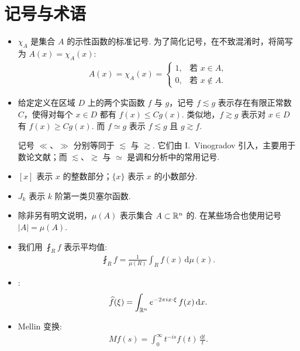 \chapter*{记号与术语}

\begin{itemize}
\item
  $\chi_A$ 是集合 $A$ 的示性函数的标准记号. 为了简化记号，在不致混淆时，将简写为 $A(x) = \chi_A(x)$:
  \begin{align*}
    A(x) = \chi_A(x) =
    \begin{cases}
      1, & \text{若 } x \in A, \\
      0, & \text{若 } x \notin A.
    \end{cases}
  \end{align*}

\item
  给定定义在区域 $D$ 上的两个实函数 $f$ 与 $g$，记号 $f \lesssim g$ 表示存在有限正常数 $C$，使得对每个 $x \in D$ 都有 $f(x) \le C g(x)$. 类似地，$f \gtrsim g$ 表示对 $x \in D$ 有 $f(x) \ge C g(x)$. 而 $f \simeq g$ 表示 $f \lesssim g$ 且 $g \gtrsim f$.

  记号 $\ll$、$\gg$ 分别等同于 $\lesssim$ 与 $\gtrsim$. 它们由 I.~Vinogradov 引入，主要用于数论文献；而 $\lesssim$、$\gtrsim$ 与 $\simeq$ 是调和分析中的常用记号.

\item
  $[x]$ 表示 $x$ 的整数部分；$\{x\}$ 表示 $x$ 的小数部分.

\item
  $J_k$ 表示 $k$ 阶第一类贝塞尔函数.

\item
  除非另有明文说明，$\mu(A)$ 表示集合 $A \subset \mathbb{R}^n$ 的. 在某些场合也使用记号 $|A| = \mu(A)$.

\item
  我们用 $\fint_R f$ 表示平均值:
  \begin{align*}
    \fint_R f = \frac{1}{\mu(R)} \int_R f(x) \, \mathrm{d}\mu(x).
  \end{align*}

\item
  :
  \begin{align*}
    \widehat{f}(\xi) = \int_{\mathbb{R}^n} e^{-2\pi i x \cdot \xi} \, f(x) \, \mathrm{d}x.
  \end{align*}

\item
  Mellin 变换:
  \begin{align*}
    M f(s) = \int_0^\infty t^{-is} f(t) \, \frac{\mathrm{d}t}{t}.
  \end{align*}


\end{itemize}
